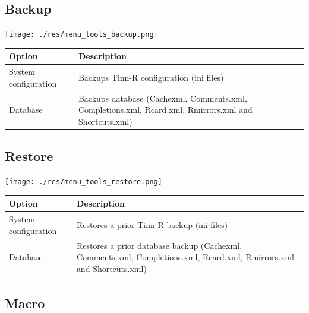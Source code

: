 \hypertarget{menu_tools_backup}{}
\subsection{Backup}

\texttt{[image: ./res/menu\_tools\_backup.png]}\\

\begin{scriptsize}
  \begin{tabularx}{\textwidth}{>{\hsize=0.3\hsize}X>{\hsize=0.7\hsize}X}\\
    \hline
    \textbf{Option} & \textbf{Description} \\
    \hline
    System configuration & Backups Tinn-R configuration (ini files) \\
    Database & Backups database (Cachexml, Comments.xml, Completions.xml, Rcard.xml, Rmirrors.xml and Shortcuts.xml) \\
    \hline
  \end{tabularx}
\end{scriptsize}


\hypertarget{menu_tools_restore}{}
\subsection{Restore}

\texttt{[image: ./res/menu\_tools\_restore.png]}\\

\begin{scriptsize}
  \begin{tabularx}{\textwidth}{>{\hsize=0.3\hsize}X>{\hsize=0.7\hsize}X}\\
    \hline
    \textbf{Option} & \textbf{Description} \\
    \hline
    System configuration & Restores a prior Tinn-R backup (ini files) \\
    Database & Restores a prior database backup (Cachexml, Comments.xml, Completions.xml, Rcard.xml, Rmirrors.xml and Shortcuts.xml) \\
    \hline
  \end{tabularx}
\end{scriptsize}


\hypertarget{menu_tools_macro}{}
\subsection{Macro}

